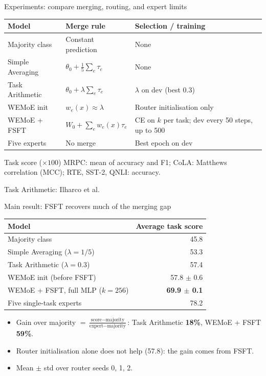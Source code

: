 \documentclass[aspectratio=169,10pt]{beamer}
\begin{document}
\begin{frame}{Experiments: compare merging, routing, and expert limits}
  \centering
  \footnotesize
  \begin{tabular}{l l l}
    \toprule
    Model & Merge rule & Selection / training\\
    \midrule
    Majority class & Constant prediction & None\\
    Simple Averaging & $\theta_0+\tfrac15\sum_e\tau_e$ & None\\
    Task Arithmetic & $\theta_0+\lambda\sum_e\tau_e$ & $\lambda$ on dev (best 0.3)\\
    WEMoE init & $w_e(x)\approx\lambda$ & Router initialisation only\\
    WEMoE + FSFT & $W_0+\sum_e w_e(x)\tau_e$ & CE on $k$ per task; dev every 50 steps, up to 500\\
    Five experts & No merge & Best epoch on dev\\
    \bottomrule
  \end{tabular}
  \vfill
  \begin{block}{Task score ($\times 100$)}
    MRPC: mean of accuracy and F1; CoLA: Matthews correlation (MCC); RTE, SST-2, QNLI: accuracy.
  \end{block}
  {\scriptsize Task Arithmetic: Ilharco et al.\cite{ilharco2023task}}
\end{frame}

\begin{frame}{Main result: FSFT recovers much of the merging gap}
  \centering
  \begin{tabular}{l r}
    \toprule
    Model & Average task score\\
    \midrule
    Majority class & 45.8\\
    Simple Averaging ($\lambda=1/5$) & 53.3\\
    Task Arithmetic ($\lambda=0.3$) & 57.4\\
    WEMoE init (before FSFT) & 57.8 $\pm$ 0.6\\
    WEMoE + FSFT, full MLP ($k=256$) & \textbf{69.9 $\pm$ 0.1}\\
    Five single-task experts & 78.2\\
    \bottomrule
  \end{tabular}
  \vfill
  \raggedright
  \begin{itemize}\footnotesize
    \item Gain over majority $=\frac{\text{score}-\text{majority}}{\text{expert}-\text{majority}}$: Task Arithmetic \textbf{18\%}, WEMoE + FSFT \textbf{59\%}.
    \item Router initialisation alone does not help (57.8): the gain comes from FSFT.
    \item Mean $\pm$ std over router seeds 0, 1, 2.
  \end{itemize}
\end{frame}
\end{document}
